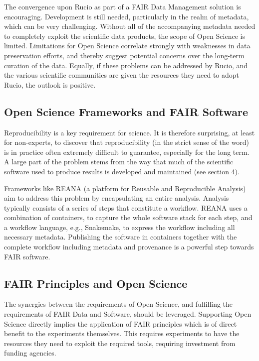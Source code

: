 The convergence upon Rucio as part of a FAIR Data Management solution is encouraging.  Development is still needed, particularly in the realm of metadata, which can be very challenging.  Without all of the accompanying metadata needed to completely exploit the scientific data products, the scope of Open Science is limited.  Limitations for Open Science correlate strongly with weaknesses in data preservation efforts, and thereby suggest potential concerns over the long-term curation of the data.  Equally, if these problems can be addressed by Rucio, and the various scientific communities are given the resources they need to adopt Rucio, the outlook is positive.

\subsection{Open Science Frameworks and FAIR Software}

Reproducibility is a key requirement for science.  It is therefore surprising, at least for non-experts, to discover that reproducibility (in the strict sense of the word) is in practice often extremely difficult to guarantee, especially for the long term. A large part of the problem stems from the way that much of the scientific software used to produce results is developed and maintained (see section 4).

Frameworks like REANA (a platform for Reusable and Reproducible Analysis) aim to address this problem by encapsulating an entire analysis.  Analysis typically consists of a series of steps that constitute a workflow.  REANA uses a combination of containers, to capture the whole software stack for each step, and a workflow language, e.g., Snakemake, to express the workflow including all necessary metadata. Publishing the software in containers together with the complete workflow including metadata and provenance is a powerful step towards FAIR software.

\subsection{FAIR Principles and Open Science}

The synergies between the requirements of Open Science, and fulfilling the requirements of FAIR Data and Software, should be leveraged.  Supporting Open Science directly implies the application of FAIR principles which is of direct benefit to the experiments themselves. This requires experiments to have the resources they need to exploit the required tools, requiring investment from funding agencies.

